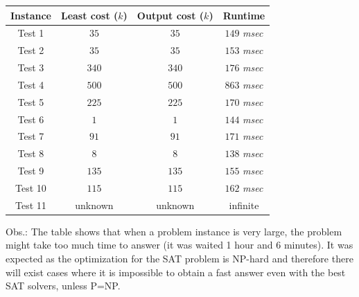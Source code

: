 \documentclass[conference]{IEEEtran}
\newcommand\tab[1][0.3cm]{\hspace*{#1}}
\begin{document}
\begin{tabular}{ c | c | c | c}
 \hline
  Instance & Least cost ($k$) & Output cost ($k$) & Runtime
  \\ \hline
      Test 1 & $35$ & $35$ & $149$ \textit{msec}\\ \hline 
      Test 2 & $35$ & $35$  &  $153$ \textit{msec}  \\ \hline
      Test 3 & $340$& $340$ &  $176$ \textit{msec} \\ \hline
      Test 4 & $500$ & $500$ &  $863$ \textit{msec} \\ \hline
      Test 5 & $225$ & $225$ &  $170$ \textit{msec} \\ \hline
      Test 6 & $1$ & $1$  &  $144$ \textit{msec} \\ \hline
      Test 7 & $91$ & $91$  &  $171$ \textit{msec} \\ \hline
      Test 8 & $8$ & $8$  &  $138$ \textit{msec} \\ \hline
      Test 9 & $135$ & $135$  &  $155$ \textit{msec} \\ \hline
      Test 10 & $115$ & $115$  &  $162$ \textit{msec} \\ \hline
      Test 11 & unknown & unknown  &  infinite \\ \hline
  \end{tabular}
\vspace*{5pt}

\tab Obs.: The table shows that when a problem instance is very large, the problem might take too much time to answer (it was waited 1 hour and 6 minutes). It was expected as the optimization for the SAT problem is NP-hard and therefore there will exist cases where it is impossible to obtain a fast answer even with the best SAT solvers, unless P=NP.
\end{document}
